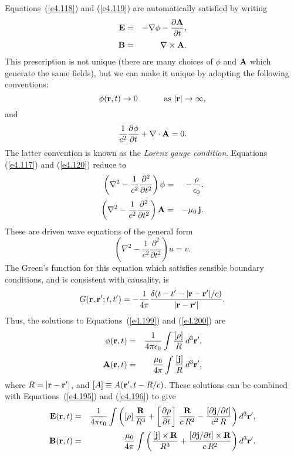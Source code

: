 Equations~(\ref{e4.118}) and (\ref{e4.119}) are automatically satisfied by writing
\begin{eqnarray}\label{e4.195}
{\bf E} &=& - \nabla\phi - \frac{\partial {\bf A}}{\partial t},\\[0.5ex]
{\bf B} &=& \nabla\times {\bf A}.\label{e4.196}
\end{eqnarray}
This prescription is not unique (there are many choices of $\phi$ and ${\bf A}$ which
generate the same fields), but we can make it unique by adopting the following conventions:
\begin{equation}
\phi({\bf r},t) \rightarrow 0 \mbox{\hspace{1cm} as~$|{\bf r}|\rightarrow \infty$},
\end{equation}
and
\begin{equation}
\frac{1}{c^2} \frac{\partial\phi}{\partial t} +\nabla\cdot{\bf A} = 0.
\end{equation}
The latter convention is known as the {\em Lorenz gauge condition}.
Equations (\ref{e4.117}) and (\ref{e4.120}) reduce to 
\begin{eqnarray}\label{e4.199}
 \left(\nabla^2 - \frac{1}{c^2}\frac{\partial^2}{\partial t^2}\right) \phi &=& - \frac{\rho}{\epsilon_0},\\[0.5ex]
  \left(\nabla^2 - \frac{1}{c^2}\frac{\partial^2}{\partial t^2}\right){\bf A} &=& - \mu_0\, {\bf j}.\label{e4.200}
\end{eqnarray}
These are driven wave equations of the general form
\begin{equation}
 \left(\nabla^2 - \frac{1}{c^2}\frac{\partial^2}{\partial t^2}\right) u = v.
\end{equation}
The Green's function for this equation which satisfies sensible boundary conditions, and is
consistent with causality, is
\begin{equation}
G({\bf r}, {\bf r}'; t, t') = - \frac{1}{4\pi}
\frac{\delta (t-t' - |{\bf r} - {\bf r}'|/c)}{|{\bf r}- {\bf r}'|}.
\end{equation}
Thus, the solutions to Equations~(\ref{e4.199}) and (\ref{e4.200}) are
\begin{eqnarray}\label{e4.203}
\phi({\bf r}, t) &= &\frac{1}{4\pi\epsilon_0}\int \frac{[\rho]}{R} \,d^3{\bf r}',\\[0.5ex]
{\bf A}({\bf r}, t)  &=& \frac{\mu_0}{4\pi} \int \frac{[{\bf j}]}{R}\,d^3{\bf r}',\label{e4.204}
\end{eqnarray}
where $R = |{\bf r} - {\bf r}'|$, and
$[A] \equiv A({\bf r}', t-R/c)$. These solutions can be combined with
Equations~(\ref{e4.195}) and (\ref{e4.196}) to give
\begin{eqnarray}\label{e4.205}
{\bf E}({\bf r}, t)& = &\frac{1}{4\pi\epsilon_0} \int \left(
[\rho] \,\frac{\bf R}{R^3} + \left[\frac{\partial\rho}{\partial t}\right]\, \frac{\bf R}{c\,R^2}
- \frac{[\partial {\bf j}/\partial t]}{c^2 \,R} \right)d^3{\bf r}',\\[0.5ex]
{\bf B}({\bf r}, t) &=& \frac{\mu_0}{4\pi} \int \left(
\frac{ [{\bf j}]\times {\bf R} }{R^3} + \frac{ [\partial {\bf j}/\partial t]\times {\bf R} }
{c\,R^2} \right)d^3{\bf r}'.\label{e4.206}
\end{eqnarray}

